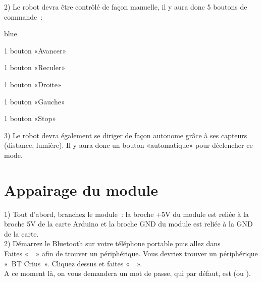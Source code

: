 2) Le robot devra être contrôlé de façon manuelle,  il y aura donc 5 boutons de commande :

\begin{items}{blue}{\Triangle}
    \item 1 bouton «Avancer»
    \item 1 bouton «Reculer»
    \item 1 bouton «Droite»
    \item 1 bouton «Gauche»
    \item 1 bouton «Stop»
\end{items}


3) Le robot devra également se diriger de façon autonome grâce à ses capteurs (distance, lumière). Il y aura donc un bouton «automatique» pour déclencher ce mode. \\

\chapter{Appairage du module} \label{appairage}


1) Tout d'abord, branchez le module : la broche +5V du module est reliée à la broche 5V de la carte Arduino et la broche GND du module est reliée à la GND de la carte. \\


2) Démarrez le Bluetooth sur votre téléphone portable puis allez dans  \\
Faites «  » afin de trouver un périphérique. 
Vous devriez trouver un périphérique « BT Crius ». Cliquez dessus et faites «  ». \\
A ce moment là, on vous demandera un mot de passe, qui par défaut, est  (ou ). \\

